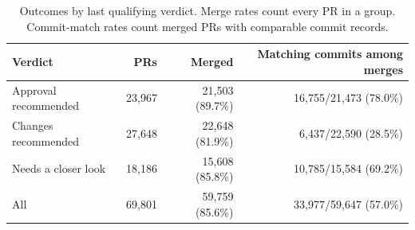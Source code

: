 \begin{table}[H]
\centering
\caption{Outcomes by last qualifying verdict. Merge rates count every PR in a group. Commit-match rates count merged PRs with comparable commit records.}
\label{tab:outcomes}
\small
\begin{tabular}{@{}lrrr@{}}
\toprule
Verdict & PRs & Merged & Matching commits among merges \\
\midrule
Approval recommended & 23,967 & 21,503 (89.7\%) & 16,755/21,473 (78.0\%) \\
Changes recommended & 27,648 & 22,648 (81.9\%) & 6,437/22,590 (28.5\%) \\
Needs a closer look & 18,186 & 15,608 (85.8\%) & 10,785/15,584 (69.2\%) \\
All & 69,801 & 59,759 (85.6\%) & 33,977/59,647 (57.0\%) \\
\bottomrule
\end{tabular}
\end{table}

